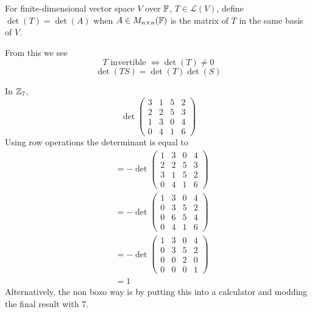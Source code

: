 \documentclass[12pt]{article}
\begin{document}
\begin{defn}
	For finite-dimensional vector space $V$ over $\mathbb{F}$, $T\in\mathcal{L}(V)$, define $\det(T)=\det(A)$ when $A\in M_{n\times n}(\mathbb{F})$ is the matrix of $T$ in the same basis of $V$.
\end{defn}

From this we see
$$T \text{ invertible } \Leftrightarrow \det(T)\neq 0$$
$$\det(TS) = \det(T)\det(S)$$

\begin{ex}
	In $\mathbb{Z}_7$,
	$$\det\begin{pmatrix} 3 & 1 & 5 & 2 \\ 2 & 2 & 5 & 3 \\ 1 & 3 & 0 & 4 \\ 0 & 4 & 1 & 6\end{pmatrix}$$
	Using row operations the determinant is equal to
	\begin{align*}
		&= -\det\begin{pmatrix} 1 & 3 & 0 & 4 \\ 2 & 2 & 5 & 3 \\ 3 & 1 & 5 & 2 \\ 0 & 4 & 1 & 6\end{pmatrix} \\
		&= -\det\begin{pmatrix} 1 & 3 & 0 & 4 \\ 0 & 3 & 5 & 2 \\ 0 & 6 & 5 & 4 \\ 0 & 4 & 1 & 6\end{pmatrix} \\
		&= -\det\begin{pmatrix} 1 & 3 & 0 & 4 \\ 0 & 3 & 5 & 2 \\ 0 & 0 & 2 & 0 \\ 0 & 0 & 0 & 1\end{pmatrix} \\
		&= 1
	\end{align*}
	Alternatively, the non bozo way is by putting this into a calculator and modding the final result with 7.
\end{ex}
\end{document}
